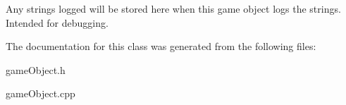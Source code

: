 Any strings logged will be stored here when this game object logs the strings. Intended for debugging. 



The documentation for this class was generated from the following files\-:\begin{DoxyCompactItemize}
\item 
game\-Object.\-h\item 
game\-Object.\-cpp\end{DoxyCompactItemize}
